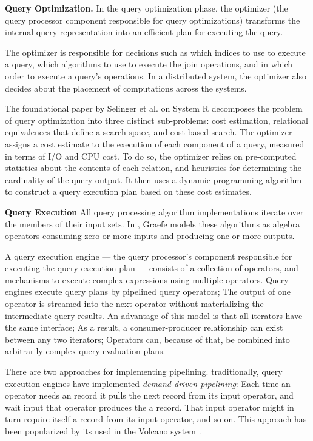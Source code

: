 \bigskip
\noindent
\textbf{Query Optimization.}
In the query optimization phase, the optimizer (the query processor component responsible for query optimizations)
transforms the internal query representation into an efficient plan for executing the query.

The optimizer is responsible for decisions such as which indices to use to execute a query,
which algorithms to use to execute the join operations,
and in which order to execute a query's operations.
In a distributed system, the optimizer also decides about the placement of computations across the systems.

The foundational paper by Selinger et al. on System R \cite{selinger:systemr} decomposes the problem of query optimization
into three distinct sub-problems: cost estimation, relational equivalences that define a search space, and cost-based
search.
The optimizer assigns a cost estimate to the execution of each component of a query, measured in terms of I/O and CPU
cost.
To do so, the optimizer relies on pre-computed statistics about the contents of each relation, and heuristics for
determining the cardinality of the query output.
It then uses a dynamic programming algorithm to construct a query execution plan based on these cost estimates.

\bigskip
\noindent
\textbf{Query Execution}
All query processing algorithm implementations iterate over the members of their input sets.
In \cite{graefe:queryevaluation}, Graefe models these algorithms as algebra operators consuming zero or more inputs and
producing one or more outputs.

A query execution engine --- the query processor's component responsible for executing the query execution plan ---
consists of a collection of operators, and mechanisms to execute complex expressions using multiple operators.
Query engines execute query plans by pipelined query operators;
The output of one operator is streamed into the next operator without materializing the intermediate query results.
An advantage of this model is that all iterators have the same interface;
As a result, a consumer-producer relationship can exist between any two iterators;
Operators can, because of that, be combined into arbitrarily complex query evaluation plans.

There are two approaches for implementing pipelining.
traditionally, query execution engines have implemented \textit{demand-driven pipelining}:
Each time an operator needs an record it pulls the next record from its input operator,
and wait input that operator produces the a record.
That input operator might in turn require itself a record from its input operator, and so on.
This approach has been popularized by its used in the Volcano system \cite{graefe:volcano}.

